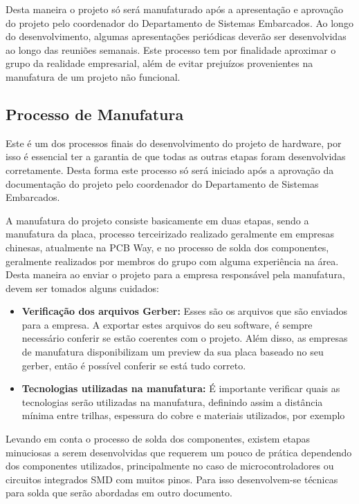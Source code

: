 Desta maneira o projeto só será manufaturado após a apresentação e aprovação do projeto pelo coordenador do Departamento de Sistemas Embarcados. Ao longo do desenvolvimento, algumas apresentações periódicas deverão ser desenvolvidas ao longo das reuniões semanais. Este processo tem por finalidade aproximar o grupo da realidade empresarial, além de evitar prejuízos provenientes na manufatura de um projeto não funcional.

\subsection{Processo de Manufatura}

 Este é um dos processos finais do desenvolvimento do projeto de hardware, por isso é essencial ter a garantia de que todas as outras etapas foram desenvolvidas corretamente. Desta forma este processo só será iniciado após a aprovação da documentação do projeto pelo coordenador do Departamento de Sistemas Embarcados. 


A manufatura do projeto consiste basicamente em duas etapas, sendo a manufatura da placa, processo terceirizado realizado geralmente em empresas chinesas, atualmente na PCB Way, e no processo de solda dos componentes, geralmente realizados por membros do grupo com alguma experiência na área. Desta maneira ao enviar o projeto para a empresa responsável pela manufatura, devem ser tomados alguns cuidados:

\begin{itemize}
    \item \textbf{Verificação dos arquivos Gerber:}
    Esses são os arquivos que são enviados para  a empresa. A exportar estes arquivos do seu software, é sempre necessário conferir se estão coerentes com o projeto. Além disso, as empresas de manufatura disponibilizam um preview da sua placa baseado no seu gerber, então é possível conferir se está tudo correto.
    \item \textbf{Tecnologias utilizadas na manufatura:}
    É importante verificar quais as tecnologias serão utilizadas na manufatura, definindo assim a distância mínima entre trilhas, espessura do cobre e materiais utilizados, por exemplo
\end{itemize}

Levando em conta o processo de solda dos componentes, existem etapas  minuciosas a serem desenvolvidas que requerem um pouco de prática dependendo dos componentes utilizados, principalmente no caso de microcontroladores ou circuitos integrados  SMD com muitos pinos. Para isso desenvolvem-se técnicas para solda que serão abordadas em outro documento.

